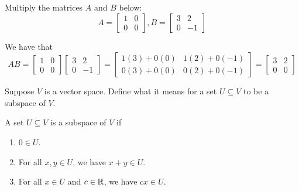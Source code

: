 \documentclass[mathshortcuts, noboxsols]{homework}
\begin{document}
		\maketitle

		\begin{problem}
				Multiply the matrices $A$ and $B$ below:
				\begin{equation*}
						A = \begin{bmatrix}
								1 & 0 \\ 0 & 0
						\end{bmatrix}, B = \begin{bmatrix}
								3 & 2 \\ 0 & -1
						\end{bmatrix}
				\end{equation*}
		\end{problem}
		\begin{soln}
				 We have that 
				 \begin{equation}
				 		AB = \begin{bmatrix}
								1 & 0 \\ 0 & 0
						\end{bmatrix}\begin{bmatrix}
								3 & 2 \\ 0 & -1
						\end{bmatrix} = \begin{bmatrix}
								1(3) + 0(0) & 1(2) + 0(-1)  \\ 
								0(3) + 0(0) & 0(2) + 0(-1)
						\end{bmatrix} = \begin{bmatrix}
								3 & 2 \\ 0 & 0
						\end{bmatrix}
				 \end{equation}
		\end{soln}

		\begin{problem}
				Suppose $V$ is a vector space. Define what it means for a set $U \subseteq V$ to be a subspace of $V$.
		\end{problem}
		\begin{soln}
				A set $U \subseteq V$ is a subspace of $V$ if
				\begin{enumerate}
						\item $0\in U$. 
						\item For all $x,y\in U$, we have $x+y\in U$. 
						\item For all $x\in U$ and $c\in \mathbb{R}$, we have $cx \in U$.
				\end{enumerate}
		\end{soln}
\end{document}
